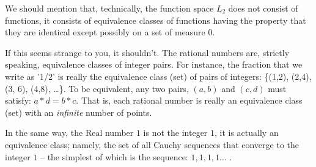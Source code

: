 \documentclass{article}
\begin{document}
We should mention that, technically, the function space $L_2$ does not 
consist of functions, it consists of 
equivalence classes of functions having the property
that they are identical except possibly on a set of measure $0$.

If this seems strange to you, it shouldn't. The rational numbers are, strictly 
speaking, equivalence classes of integer pairs.
For instance, the fraction that we write as '1/2' is really the 
equivalence class (set) of pairs of integers: 
\{(1,2), (2,4), (3, 6), (4,8), \ldots \}.
To be equivalent, any two pairs, $(a, b)$ and $(c, d)$ must satisfy: 
$a * d = b * c$. That is, each rational number is really an equivalence class (set)
with an {\em infinite\/} number of points.

In the same way, the Real number $1$ is not the integer $1$, it is actually an equivalence 
class; namely, the set of all Cauchy sequences that converge to the integer 
$1$ -- the simplest of which is the sequence: $1, 1, 1, 1\ldots$ .
\end{document}
